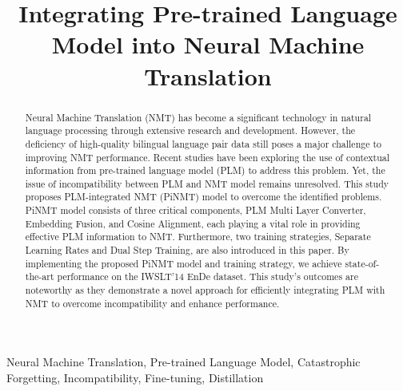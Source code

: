 \documentclass[conference]{IEEEtran}
\begin{document}
\title{Integrating Pre-trained Language Model into Neural Machine Translation}


\author{
\and
{}
}

\maketitle

\begin{abstract}
Neural Machine Translation (NMT) has become a significant technology in natural language processing through extensive research and development. However, the deficiency of high-quality bilingual language pair data still poses a major challenge to improving NMT performance. Recent studies have been exploring the use of contextual information from pre-trained language model (PLM) to address this problem. Yet, the issue of incompatibility between PLM and NMT model remains unresolved. This study proposes PLM-integrated NMT (PiNMT) model to overcome the identified problems. PiNMT model consists of three critical components, PLM Multi Layer Converter, Embedding Fusion, and Cosine Alignment, each playing a vital role in providing effective PLM information to NMT. Furthermore, two training strategies, Separate Learning Rates and Dual Step Training, are also introduced in this paper. By implementing the proposed PiNMT model and training strategy, we achieve state-of-the-art performance on the IWSLT'14 EnDe dataset. This study's outcomes are noteworthy as they demonstrate a novel approach for efficiently integrating PLM with NMT to overcome incompatibility and enhance performance.
\end{abstract}

\begin{IEEEkeywords}
Neural Machine Translation, Pre-trained Language Model, Catastrophic Forgetting, Incompatibility, Fine-tuning, Distillation 
\end{IEEEkeywords}
\end{document}
